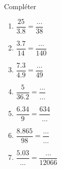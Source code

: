
\begin{exercice}\label{exosmath-0867}

    Compléter
    \begin{multicols}{2}
    \begin{enumerate}
        \item
            \( \dfrac{ 25 }{ 3.8 }=\dfrac{ \ldots }{ 38 }\)
        \item
            \( \dfrac{  3.7  }{  14  }=\dfrac{  \ldots  }{ 140 }\)
        \item
            \( \dfrac{  7.3  }{  4.9  }=\dfrac{  \ldots  }{ 49 }\)
        \item
            \( \dfrac{  5  }{  36.2  }=\dfrac{ \ldots   }{ \ldots }\)
        \item
            \( \dfrac{  6.34  }{  9  }=\dfrac{  634  }{ \ldots }\)
        \item
            \( \dfrac{  8.865  }{  98  }=\dfrac{  \ldots  }{ \ldots }\)
        \item
            \( \dfrac{  5.03  }{  \ldots  }=\dfrac{  \ldots  }{ 12066 }\)
    \end{enumerate}
    \end{multicols}

\end{exercice}
